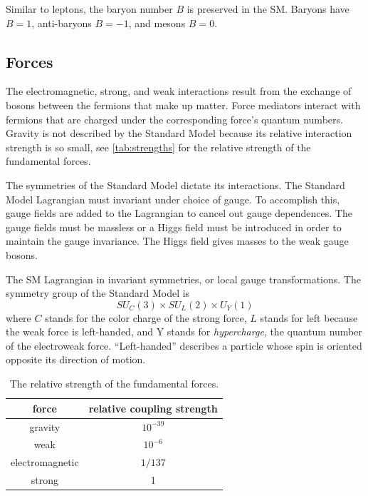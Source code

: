 Similar to leptons, the baryon number $B$ is preserved in the \ac{SM}. Baryons have $B = 1$, anti-baryons $B=-1$, and mesons $B=0$.

\subsection{Forces}

The electromagnetic, strong, and weak interactions result from the exchange of bosons between the fermions that make up matter. Force mediators interact with fermions that are charged under the corresponding force's quantum numbers. Gravity is not described by the Standard Model because its relative interaction strength is so small, see \autoref{tab:strengths} for the relative strength of the fundamental forces.

The symmetries of the Standard Model dictate its interactions. The Standard Model Lagrangian must invariant under choice of gauge. To accomplish this, gauge fields are added to the Lagrangian to cancel out gauge dependences. The gauge fields must be massless or a Higgs field must be introduced in order to maintain the gauge invariance. The Higgs field gives masses to the weak gauge bosons.

The \ac{SM} Lagrangian in invariant symmetries, or local gauge transformations. The symmetry group of the Standard Model is 
\begin{equation}
SU_{C}(3) \times SU_{L}(2) \times U_{Y}(1) 
\end{equation}
where $C$ stands for the color charge of the strong force, $L$ stands for left because the weak force is left-handed, and Y stands for \emph{hypercharge}, the quantum number of the electroweak force. ``Left-handed'' describes a particle whose spin is oriented opposite its direction of motion. 


\begin{table}[htb]
\begin{center}
\begin{tabular}{cc}
 force & relative coupling strength \\
 \hline
  gravity   &  $10^{-39}$    \\
  weak      &  $10^{-6}$     \\
  electromagnetic  &  $1/137 $   \\
  strong  &  1     \\
\hline
\end{tabular}
\caption{The relative strength of the fundamental forces.}
\label{tab:strengths}
\end{center}
\end{table}


